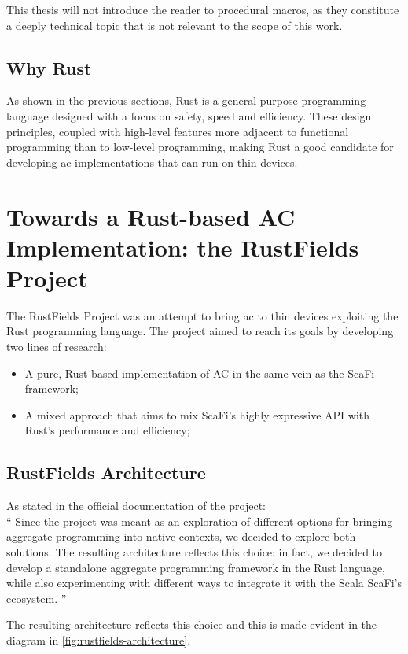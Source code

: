 

This thesis will not introduce the reader to procedural macros, as they constitute a deeply technical topic that is not relevant to the scope of this work.

\subsection{Why Rust}
As shown in the previous sections, Rust is a general-purpose programming language designed with a focus on safety, speed and efficiency. These design principles, coupled with high-level features
more adjacent to functional programming than to low-level programming, making Rust a good candidate for developing \ac{ac} implementations that can run on thin devices.


\section{Towards a Rust-based AC Implementation: the RustFields Project}
The RustFields Project\cite{001} was an attempt to bring \ac{ac} to thin devices exploiting the Rust programming language. The project aimed to reach its goals by developing two lines of research:
\begin{itemize}
    \item A pure, Rust-based implementation of AC in the same vein as the ScaFi framework;
    \item A mixed approach that aims to mix ScaFi's highly expressive API with Rust's performance and efficiency;
\end{itemize}

\subsection{RustFields Architecture}
As stated in the official documentation of the project: \\
``    Since the project was meant as an exploration of different options for bringing aggregate programming into native contexts, we decided to explore both solutions. The resulting architecture reflects this choice: in fact, we decided to develop a standalone aggregate programming framework in the Rust language, while also experimenting with different ways to integrate it with the Scala ScaFi’s ecosystem.
''

The resulting architecture reflects this choice and this is made evident in the diagram in \cref{fig:rustfields-architecture}.

